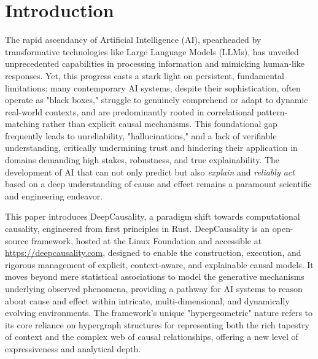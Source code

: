 \section{Introduction}
\label{sec:introduction}

The rapid ascendancy of Artificial Intelligence (AI), spearheaded by transformative technologies like Large Language Models (LLMs), has unveiled unprecedented capabilities in processing information and mimicking human-like responses. Yet, this progress casts a stark light on persistent, fundamental limitations: many contemporary AI systems, despite their sophistication, often operate as "black boxes," struggle to genuinely comprehend or adapt to dynamic real-world contexts, and are predominantly rooted in correlational pattern-matching rather than explicit causal mechanisms. 
This foundational gap frequently leads to unreliability, "hallucinations," and a lack of verifiable understanding, critically undermining trust and hindering their application in domains demanding high stakes, robustness, and true explainability. The development of AI that can not only predict but also \textit{explain} and \textit{reliably act} based on a deep understanding of cause and effect remains a paramount scientific and engineering endeavor.

This paper introduces DeepCausality, a paradigm shift towards computational causality, engineered from first principles in Rust. DeepCausality is an open-source framework, hosted at the Linux Foundation and accessible at \url{https://deepcausality.com}, designed to enable the construction, execution, and rigorous management of explicit, context-aware, and explainable causal models. It moves beyond mere statistical associations to model the generative mechanisms underlying observed phenomena, providing a pathway for AI systems to reason about cause and effect within intricate, multi-dimensional, and dynamically evolving environments. 
The framework's unique "hypergeometric" nature refers to its core reliance on hypergraph structures for representing both the rich tapestry of context and the complex web of causal relationships, offering a new level of expressiveness and analytical depth.

